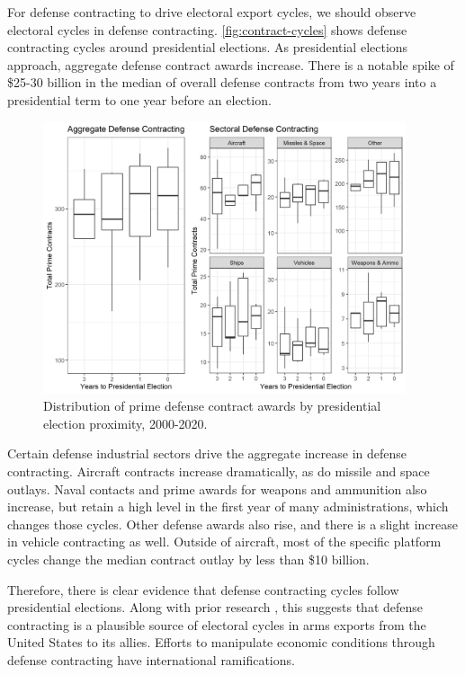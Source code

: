 \documentclass[12pt]{article}
\begin{document}
For defense contracting to drive electoral export cycles, we should observe electoral cycles in defense contracting.
\autoref{fig:contract-cycles} shows defense contracting cycles around presidential elections. 
As presidential elections approach, aggregate defense contract awards increase. 
There is a notable spike of \$25-30 billion in the median of overall defense contracts from two years into a presidential term to one year before an election. 


\begin{figure}[htpb]
	\centering
		\includegraphics[width=0.95\textwidth]{../figures/contract-cycles.png}
	\caption{Distribution of prime defense contract awards by presidential election proximity, 2000-2020.}
	\label{fig:contract-cycles}
\end{figure}


Certain defense industrial sectors drive the aggregate increase in defense contracting. 
Aircraft contracts increase dramatically, as do missile and space outlays. 
Naval contacts and prime awards for weapons and ammunition also increase, but retain a high level in the first year of many administrations, which changes those cycles. 
Other defense awards also rise, and there is a slight increase in vehicle contracting as well. 
Outside of aircraft, most of the specific platform cycles change the median contract outlay by less than \$10 billion.


Therefore, there is clear evidence that defense contracting cycles follow presidential elections.
Along with prior research \citep{DerouenHeo2000}, this suggests that defense contracting is a plausible source of electoral cycles in arms exports from the United States to its allies.
Efforts to manipulate economic conditions through defense contracting have international ramifications. 
\end{document}
